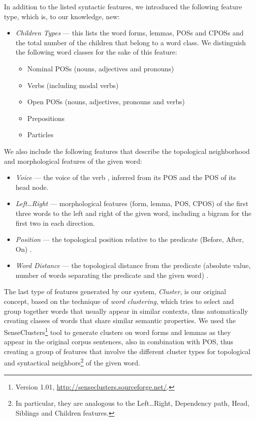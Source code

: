 \documentclass[12pt,notitlepage]{report}
\begin{document}
In addition to the listed syntactic features, we introduced the following feature type, which is, to our knowledge, new:
\begin{itemize}
    \item \emph{Children Types} --- this lists the word forms, lemmas, POSs and CPOSs and the total number of the children that belong to a word class. We distinguish the following word classes for the sake of this feature:
    \begin{itemize}
        \item Nominal POSs (nouns, adjectives and pronouns)
        \item Verbs (including modal verbs)
        \item Open POSs (nouns, adjectives, pronouns and verbs)
        \item Prepositions
        \item Particles
    \end{itemize}
\end{itemize}

We also include the following features that describe the topological neighborhood and morphological features of the given word:
\begin{itemize}
    \item \emph{Voice} --- the voice of the verb \citep{che09}, inferred from its POS and the POS of its head node.
    \item \emph{Left\dots Right} --- morphological features (form, lemma, POS, CPOS) of the first three words to the left and right of the given word, including a bigram for the first two in each direction.
    \item \emph{Position} --- the topological position relative to the predicate (Before, After, On) \citep{nugues09}.
    \item \emph{Word Distance} --- the topological distance from the predicate (absolute value, number of words separating the predicate and the given word) \citep{asahara09}.
\end{itemize}

The last type of features generated by our system, \emph{Cluster}, is our original concept, based on the technique of \emph{word clustering}\citep{pereira93}, which tries to select and group together words that usually appear in similar contexts, thus automatically creating classes of words that share similar semantic properties. We used the SenseClusters\footnote{Version 1.01, \url{http://senseclusters.sourceforge.net/}.} tool \citep{kulkarni05} to generate clusters on word forms and lemmas as they appear in the original corpus sentences, also in combination with POS, thus creating a group of features that involve the different cluster types for topological and syntactical neighbors\footnote{In particular, they are analogous to the Left\dots Right, Dependency path, Head, Siblings and Children features.} of the given word.
\end{document}
